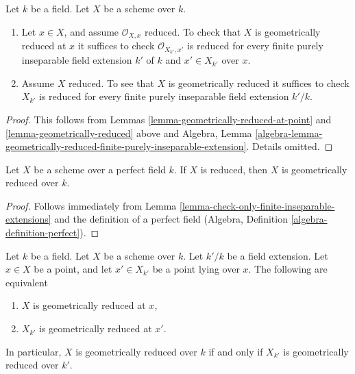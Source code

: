 \begin{lemma}
\label{lemma-check-only-finite-inseparable-extensions}
Let $k$ be a field. Let $X$ be a scheme over $k$.
\begin{enumerate}
\item Let $x \in X$, and assume $\mathcal{O}_{X, x}$ reduced.
To check that $X$ is geometrically reduced at $x$ it suffices to check
$\mathcal{O}_{X_{k'}, x'}$ is reduced for every
finite purely inseparable field extension $k'$ of $k$ and
$x' \in X_{k'}$ over $x$.
\item Assume $X$ reduced.
To see that $X$ is geometrically reduced it suffices to check
$X_{k'}$ is reduced for every finite purely inseparable field
extension $k'/k$.
\end{enumerate}
\end{lemma}

\begin{proof}
This follows from Lemmas \ref{lemma-geometrically-reduced-at-point}
and \ref{lemma-geometrically-reduced} above and Algebra, Lemma
\ref{algebra-lemma-geometrically-reduced-finite-purely-inseparable-extension}.
Details omitted.
\end{proof}

\begin{lemma}
\label{lemma-perfect-reduced}
Let $X$ be a scheme over a perfect field $k$.
If $X$ is reduced, then $X$ is geometrically reduced over $k$.
\end{lemma}

\begin{proof}
Follows immediately from
Lemma \ref{lemma-check-only-finite-inseparable-extensions}
and the definition of a perfect field
(Algebra, Definition \ref{algebra-definition-perfect}).
\end{proof}

\begin{lemma}
\label{lemma-geometrically-reduced-upstairs}
Let $k$ be a field.
Let $X$ be a scheme over $k$.
Let $k'/k$ be a field extension.
Let $x \in X$ be a point, and let $x' \in X_{k'}$ be a point lying over $x$.
The following are equivalent
\begin{enumerate}
\item $X$ is geometrically reduced at $x$,
\item $X_{k'}$ is geometrically reduced at $x'$.
\end{enumerate}
In particular, $X$ is geometrically reduced over $k$ if and only if
$X_{k'}$ is geometrically reduced over $k'$.
\end{lemma}

